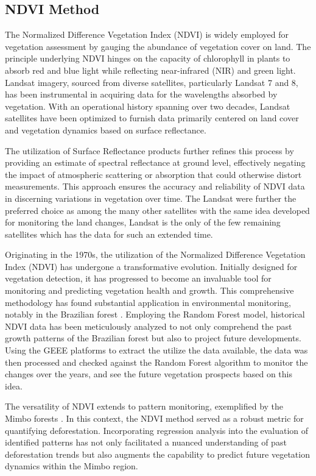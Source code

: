 \documentclass[12pt,a4paper,IEEEtran]{article}
\begin{document}
\subsection[3.3]{NDVI Method}
The Normalized Difference Vegetation Index (NDVI) is widely employed for vegetation assessment by gauging the abundance of vegetation cover on land. The principle underlying NDVI hinges on the capacity of chlorophyll in plants to absorb red and blue light while reflecting near-infrared (NIR) and green light. Landsat imagery, sourced from diverse satellites, particularly Landsat 7 and 8, has been instrumental in acquiring data for the wavelengths absorbed by vegetation. With an operational history spanning over two decades, Landsat satellites have been optimized to furnish data primarily centered on land cover and vegetation dynamics based on surface reflectance. 

The utilization of Surface Reflectance products further refines this process by providing an estimate of spectral reflectance at ground level, effectively negating the impact of atmospheric scattering or absorption that could otherwise distort measurements. This approach ensures the accuracy and reliability of NDVI data in discerning variations in vegetation over time. The Landsat were further the preferred choice as among the many other satellites with the same idea developed for monitoring the land changes, Landsat is the only of the few remaining satellites which has the data for such an extended time. 

Originating in the 1970s, the utilization of the Normalized Difference Vegetation Index (NDVI) has undergone a transformative evolution. Initially designed for vegetation detection, it has progressed to become an invaluable tool for monitoring and predicting vegetation health and growth. This comprehensive methodology has found substantial application in environmental monitoring, notably in the Brazilian forest \cite{su11010098}. Employing the Random Forest model, historical NDVI data has been meticulously analyzed to not only comprehend the past growth patterns of the Brazilian forest but also to project future developments. Using the GEEE platforms to extract the utilize the data available, the data was then processed and checked against the Random Forest algorithm to monitor the changes over the years, and see the future vegetation prospects based on this idea.  

The versatility of NDVI extends to pattern monitoring, exemplified by the Mimbo forests \cite{ijgi9100580}. In this context, the NDVI method served as a robust metric for quantifying deforestation. Incorporating regression analysis into the evaluation of identified patterns has not only facilitated a nuanced understanding of past deforestation trends but also augments the capability to predict future vegetation dynamics within the Mimbo region. 
\end{document}
